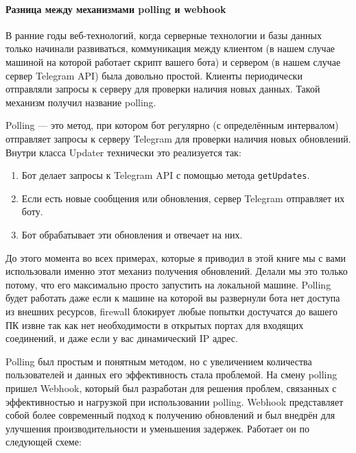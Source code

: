 \documentclass[
]{book}
\providecommand{\tightlist}{%
  \setlength{\itemsep}{0pt}\setlength{\parskip}{0pt}}
\begin{document}
\paragraph{Разница между механизмами polling и webhook}\label{ux440ux430ux437ux43dux438ux446ux430-ux43cux435ux436ux434ux443-ux43cux435ux445ux430ux43dux438ux437ux43cux430ux43cux438-polling-ux438-webhook}

В ранние годы веб-технологий, когда серверные технологии и базы данных только начинали развиваться, коммуникация между клиентом (в нашем случае машиной на которой работает скрипт вашего бота) и сервером (в нашем случае сервер Telegram API) была довольно простой. Клиенты периодически отправляли запросы к серверу для проверки наличия новых данных. Такой механизм получил название polling.

Polling --- это метод, при котором бот регулярно (с определённым интервалом) отправляет запросы к серверу Telegram для проверки наличия новых обновлений. Внутри класса Updater технически это реализуется так:

\begin{enumerate}
\def\labelenumi{\arabic{enumi}.}
\tightlist
\item
  Бот делает запросы к Telegram API с помощью метода \texttt{getUpdates}.
\item
  Если есть новые сообщения или обновления, сервер Telegram отправляет их боту.
\item
  Бот обрабатывает эти обновления и отвечает на них.
\end{enumerate}

До этого момента во всех примерах, которые я приводил в этой книге мы с вами использовали именно этот механиз получения обновлений. Делали мы это только потому, что его максимально просто запустить на локальной машине. Polling будет работать даже если к машине на которой вы развернули бота нет доступа из внешних ресурсов, firewall блокирует любые попытки достучатся до вашего ПК извне так как нет необходимости в открытых портах для входящих соединений, и даже если у вас динамический IP адрес.

Polling был простым и понятным методом, но с увеличением количества пользователей и данных его эффективность стала проблемой. На смену polling пришел Webhook, который был разработан для решения проблем, связанных с эффективностью и нагрузкой при использовании polling. Webhook представляет собой более современный подход к получению обновлений и был внедрён для улучшения производительности и уменьшения задержек. Работает он по следующей схеме:
\end{document}
